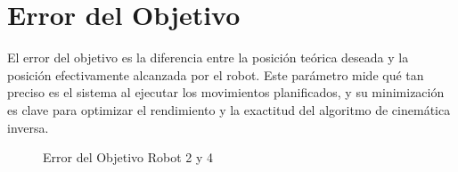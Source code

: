 \section{Error del Objetivo}
El error del objetivo es la diferencia entre la posición teórica deseada y la posición efectivamente alcanzada por el robot. Este parámetro mide qué tan preciso es el sistema al ejecutar los movimientos planificados, y su minimización es clave para optimizar el rendimiento y la exactitud del algoritmo de cinemática inversa.
\begin{figure}[h]
	\centering	
	\hfill
	\caption{Error del Objetivo Robot 2 y 4}
	\label{fig:Error del Objetivo Robot 2 y 4}
\end{figure}

